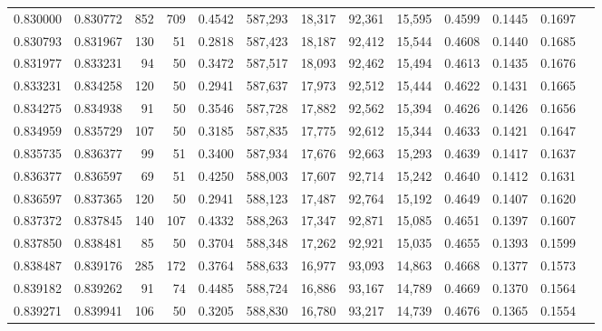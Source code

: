 \begin{tabular}{rrrrrrrrrrrrr}
0.830000 & 0.830772 &   852 & 709 &                                     0.4542 & 587,293 &  18,317 &  92,361 &  15,595 & 0.4599 & 0.1445 & 0.1697 \\
0.830793 & 0.831967 &   130 &  51 &                                     0.2818 & 587,423 &  18,187 &  92,412 &  15,544 & 0.4608 & 0.1440 & 0.1685 \\
0.831977 & 0.833231 &    94 &  50 &                                     0.3472 & 587,517 &  18,093 &  92,462 &  15,494 & 0.4613 & 0.1435 & 0.1676 \\
0.833231 & 0.834258 &   120 &  50 &                                     0.2941 & 587,637 &  17,973 &  92,512 &  15,444 & 0.4622 & 0.1431 & 0.1665 \\
0.834275 & 0.834938 &    91 &  50 &                                     0.3546 & 587,728 &  17,882 &  92,562 &  15,394 & 0.4626 & 0.1426 & 0.1656 \\
0.834959 & 0.835729 &   107 &  50 &                                     0.3185 & 587,835 &  17,775 &  92,612 &  15,344 & 0.4633 & 0.1421 & 0.1647 \\
0.835735 & 0.836377 &    99 &  51 &                                     0.3400 & 587,934 &  17,676 &  92,663 &  15,293 & 0.4639 & 0.1417 & 0.1637 \\
0.836377 & 0.836597 &    69 &  51 &                                     0.4250 & 588,003 &  17,607 &  92,714 &  15,242 & 0.4640 & 0.1412 & 0.1631 \\
0.836597 & 0.837365 &   120 &  50 &                                     0.2941 & 588,123 &  17,487 &  92,764 &  15,192 & 0.4649 & 0.1407 & 0.1620 \\
0.837372 & 0.837845 &   140 & 107 &                                     0.4332 & 588,263 &  17,347 &  92,871 &  15,085 & 0.4651 & 0.1397 & 0.1607 \\
0.837850 & 0.838481 &    85 &  50 &                                     0.3704 & 588,348 &  17,262 &  92,921 &  15,035 & 0.4655 & 0.1393 & 0.1599 \\
0.838487 & 0.839176 &   285 & 172 &                                     0.3764 & 588,633 &  16,977 &  93,093 &  14,863 & 0.4668 & 0.1377 & 0.1573 \\
0.839182 & 0.839262 &    91 &  74 &                                     0.4485 & 588,724 &  16,886 &  93,167 &  14,789 & 0.4669 & 0.1370 & 0.1564 \\
0.839271 & 0.839941 &   106 &  50 &                                     0.3205 & 588,830 &  16,780 &  93,217 &  14,739 & 0.4676 & 0.1365 & 0.1554 \\

\end{tabular}
